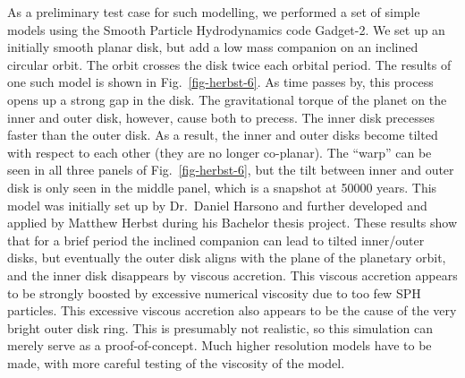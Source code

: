 \documentclass[10pt,fleqn,twoside]{article}
\begin{document}
As a preliminary test case for such modelling, we performed a set of simple
models using the Smooth Particle Hydrodynamics code Gadget-2. We set up an
initially smooth planar disk, but add a low mass companion on an inclined
circular orbit. The orbit crosses the disk twice each orbital period. The
results of one such model is shown in Fig.~\ref{fig-herbst-6}. As time
passes by, this process opens up a strong gap in the disk. The gravitational
torque of the planet on the inner and outer disk, however, cause both to
precess. The inner disk precesses faster than the outer disk. As a result,
the inner and outer disks become tilted with respect to each other (they are
no longer co-planar). The ``warp'' can be seen in all three panels of
Fig.~\ref{fig-herbst-6}, but the tilt between inner and outer disk is only
seen in the middle panel, which is a snapshot at 50000 years. This model was
initially set up by Dr.~Daniel Harsono and further developed and applied by
Matthew Herbst during his Bachelor thesis project. These results show that
for a brief period the inclined companion can lead to tilted inner/outer
disks, but eventually the outer disk aligns with the plane of the planetary
orbit, and the inner disk disappears by viscous accretion. This viscous
accretion appears to be strongly boosted by excessive numerical viscosity
due to too few SPH particles. This excessive viscous accretion also appears
to be the cause of the very bright outer disk ring. This is presumably not
realistic, so this simulation can merely serve as a proof-of-concept. Much
higher resolution models have to be made, with more careful testing of the
viscosity of the model.
\end{document}
